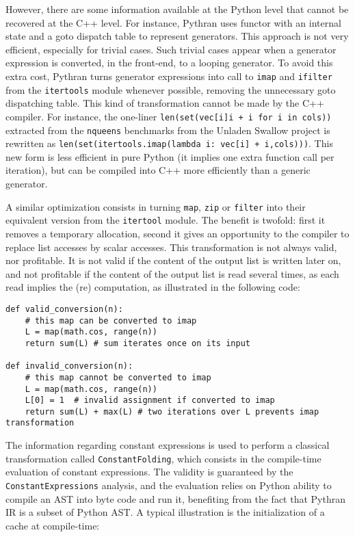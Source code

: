\documentclass[10pt, onecolumn, preprint]{sigplanconf}
\begin{document}
However, there are some information available at the Python level that cannot
be recovered at the C++ level. For instance, Pythran uses functor with an
internal state and a goto dispatch table to represent generators. This approach
is not very efficient, especially for trivial cases.
Such trivial cases appear when a generator expression is converted, in the
front-end, to a looping generator. To avoid this extra cost, Pythran turns
generator expressions into call to \texttt{imap} and \texttt{ifilter} from the
\texttt{itertools} module whenever possible, removing the unnecessary goto
dispatching table. This kind of transformation cannot be made by the C++
compiler. For instance, the one-liner \texttt{len(set(vec[i]i + i for i in cols))}
extracted from the \texttt{nqueens} benchmarks from the Unladen Swallow project
is rewritten as \texttt{len(set(itertools.imap(lambda i: vec[i] + i,cols)))}.
This new form is less efficient in pure Python (it implies one extra function
call per iteration), but can be compiled into C++ more efficiently than a
generic generator.

A similar optimization consists in turning \texttt{map}, \texttt{zip} or
\texttt{filter} into their equivalent version from the \texttt{itertool}
module. The benefit is twofold: first it removes a temporary allocation, second
it gives an opportunity to the compiler to replace list accesses by scalar
accesses. This transformation is not always valid, nor profitable. It is not
valid if the content of the output list is written later on, and not profitable
if the content of the output list is read several times, as each read implies
the (re) computation, as illustrated in the following code:

\begin{lstlisting}
def valid_conversion(n):
    # this map can be converted to imap
    L = map(math.cos, range(n))
    return sum(L) # sum iterates once on its input

def invalid_conversion(n):
    # this map cannot be converted to imap
    L = map(math.cos, range(n))
    L[0] = 1  # invalid assignment if converted to imap
    return sum(L) + max(L) # two iterations over L prevents imap transformation
\end{lstlisting}

The information regarding constant expressions is used to perform a classical
transformation called \texttt{ConstantFolding}, which consists in the compile-time
evaluation of constant expressions. The validity is guaranteed by the
\texttt{ConstantExpressions} analysis, and the evaluation relies on Python ability to
compile an AST into byte code and run it, benefiting from the fact that Pythran
IR is a subset of Python AST. A typical illustration is the initialization of a
cache at compile-time:
\end{document}
